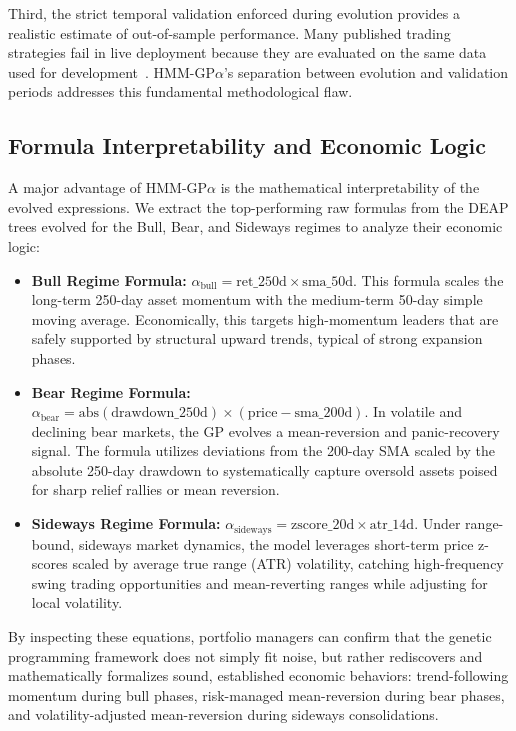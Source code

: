 \documentclass{ieeeaccess}
\newcommand{\revised}[1]{#1}
\begin{document}
Third, the strict temporal validation enforced during evolution provides a realistic estimate of out-of-sample performance. Many published trading strategies fail in live deployment because they are evaluated on the same data used for development~\cite{b22}. HMM-GP$\alpha$'s separation between evolution and validation periods addresses this fundamental methodological flaw.

\subsection{\revised{Formula Interpretability and Economic Logic}}
\label{sec:interpretability}
\revised{A major advantage of HMM-GP$\alpha$ is the mathematical interpretability of the evolved expressions. We extract the top-performing raw formulas from the DEAP trees evolved for the Bull, Bear, and Sideways regimes to analyze their economic logic:}

\begin{itemize}
    \item \revised{\textbf{Bull Regime Formula:} $\alpha_{\text{bull}} = \text{ret\_250d} \times \text{sma\_50d}$. This formula scales the long-term 250-day asset momentum with the medium-term 50-day simple moving average. Economically, this targets high-momentum leaders that are safely supported by structural upward trends, typical of strong expansion phases.}
    \item \revised{\textbf{Bear Regime Formula:} $\alpha_{\text{bear}} = \text{abs}(\text{drawdown\_250d}) \times (\text{price} - \text{sma\_200d})$. In volatile and declining bear markets, the GP evolves a mean-reversion and panic-recovery signal. The formula utilizes deviations from the 200-day SMA scaled by the absolute 250-day drawdown to systematically capture oversold assets poised for sharp relief rallies or mean reversion.}
    \item \revised{\textbf{Sideways Regime Formula:} $\alpha_{\text{sideways}} = \text{zscore\_20d} \times \text{atr\_14d}$. Under range-bound, sideways market dynamics, the model leverages short-term price z-scores scaled by average true range (ATR) volatility, catching high-frequency swing trading opportunities and mean-reverting ranges while adjusting for local volatility.}
\end{itemize}

\revised{By inspecting these equations, portfolio managers can confirm that the genetic programming framework does not simply fit noise, but rather rediscovers and mathematically formalizes sound, established economic behaviors: trend-following momentum during bull phases, risk-managed mean-reversion during bear phases, and volatility-adjusted mean-reversion during sideways consolidations.}
\end{document}

